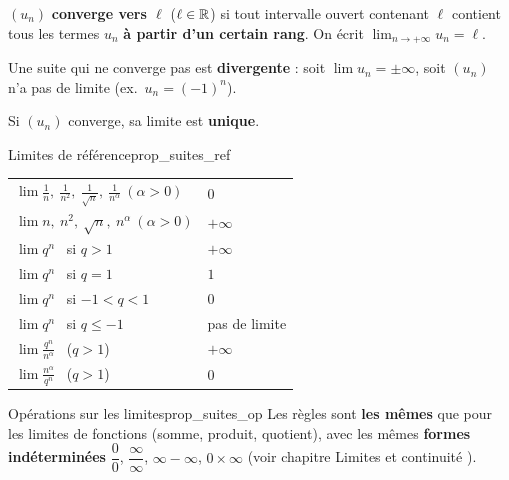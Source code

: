 \begin{definition}
	$(u_n)$ \textbf{converge vers $\ell$} ($\ell\in\mathbb{R}$) si tout intervalle
	ouvert contenant $\ell$ contient tous les termes $u_n$ \textbf{à partir
	d'un certain rang}. On écrit $\displaystyle\lim_{n\to+\infty}u_n=\ell$.

	Une suite qui ne converge pas est \textbf{divergente} : soit
	$\displaystyle\lim u_n=\pm\infty$, soit $(u_n)$ n'a pas de limite
	(ex.\ $u_n=(-1)^{n}$).
\end{definition}

\begin{theoreme}
	Si $(u_n)$ converge, sa limite est \textbf{unique}.
\end{theoreme}

\begin{propriete}{Limites de référence}{prop_suites_ref}
	\begin{center}
	\renewcommand{\arraystretch}{1.9}
	\setlength{\tabcolsep}{6pt}
	\begin{tabular}{>{\raggedright\arraybackslash}p{5.6cm}
	                >{\centering\arraybackslash}p{2.4cm}}
	\hline
	$\displaystyle\lim\frac{1}{n},\ \frac{1}{n^{2}},\ \frac{1}{\sqrt{n}},\
	\frac{1}{n^{\alpha}}\ (\alpha>0)$ & $0$ \\
	$\displaystyle\lim n,\ n^{2},\ \sqrt{n},\ n^{\alpha}\ (\alpha>0)$ & $+\infty$ \\
	$\displaystyle\lim q^{n}$ \ si $q>1$          & $+\infty$ \\
	$\displaystyle\lim q^{n}$ \ si $q=1$          & $1$ \\
	$\displaystyle\lim q^{n}$ \ si $-1<q<1$       & $0$ \\
	$\displaystyle\lim q^{n}$ \ si $q\leq-1$      & pas de limite \\
	$\displaystyle\lim\frac{q^{n}}{n^{\alpha}}$ \ ($q>1$) & $+\infty$ \\
	$\displaystyle\lim\frac{n^{\alpha}}{q^{n}}$ \ ($q>1$) & $0$ \\
	\hline
	\end{tabular}
	\end{center}
\end{propriete}

\begin{propriete}{Opérations sur les limites}{prop_suites_op}
	Les règles sont \textbf{les mêmes} que pour les limites de fonctions
	(somme, produit, quotient), avec les mêmes \textbf{formes indéterminées}
	$\dfrac{0}{0}$, $\dfrac{\infty}{\infty}$, $\infty-\infty$, $0\times\infty$
	(voir chapitre \og Limites et continuité \fg).
\end{propriete}

